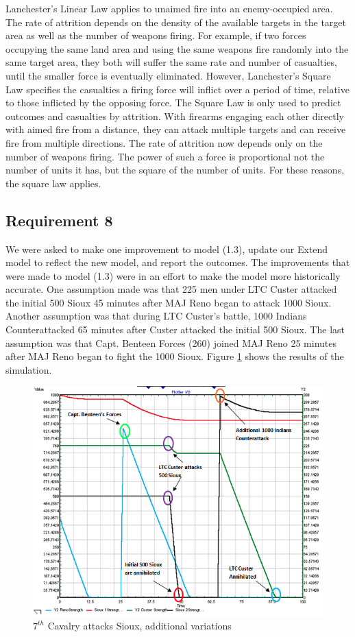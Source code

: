 \documentclass[letterpaper,10pt]{article}
\begin{document}
Lanchester’s Linear Law applies to unaimed fire into an enemy-occupied area. The rate of attrition depends on the density of the available targets in the target area as well as the number of weapons firing. For example, if two forces occupying the same land area and using the same weapons fire randomly into the same target area, they both will suffer the same rate and number of casualties, until the smaller force is eventually eliminated. However, Lanchester’s Square Law specifies the casualties a firing force will inflict over a period of time, relative to those inflicted by the opposing force. The Square Law is only used to predict outcomes and casualties by attrition. With firearms engaging each other directly with aimed fire from a distance, they can attack multiple targets and can receive fire from multiple directions. The rate of attrition now depends only on the number of weapons firing. The power of such a force is proportional not the number of units it has, but the square of the number of units. For these reasons, the square law applies.   

\subsection{Requirement 8}
We were asked to make one improvement to model (1.3), update our Extend model to reflect the new model, and report the outcomes. The improvements that were made to model (1.3) were in an effort to make the model more historically accurate. One assumption made was that 225 men under LTC Custer attacked the initial 500 Sioux 45 minutes after MAJ Reno began to attack 1000 Sioux. Another assumption was that during LTC Custer’s battle, 1000 Indians Counterattacked 65 minutes after Custer attacked the initial 500 Sioux.  The last assumption was that Capt. Benteen Forces (260) joined MAJ Reno 25 minutes after MAJ Reno began to fight the 1000 Sioux. Figure \ref{fig8a} shows the results of the simulation.
\begin{figure}[h!tp]
\begin{center}
\includegraphics[scale=0.5]{fig8a.png}
\caption{$7^{th}$ Cavalry attacks Sioux, additional variations}
\label{fig8a}
\end{center}
\end{figure}
\end{document}
